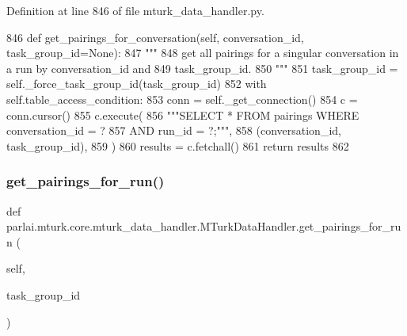 Definition at line 846 of file mturk\+\_\+data\+\_\+handler.\+py.


\begin{DoxyCode}
846     \textcolor{keyword}{def }get\_pairings\_for\_conversation(self, conversation\_id, task\_group\_id=None):
847         \textcolor{stringliteral}{"""}
848 \textcolor{stringliteral}{        get all pairings for a singular conversation in a run by conversation\_id and}
849 \textcolor{stringliteral}{        task\_group\_id.}
850 \textcolor{stringliteral}{        """}
851         task\_group\_id = self.\_force\_task\_group\_id(task\_group\_id)
852         with self.table\_access\_condition:
853             conn = self.\_get\_connection()
854             c = conn.cursor()
855             c.execute(
856                 \textcolor{stringliteral}{"""SELECT * FROM pairings WHERE conversation\_id = ?}
857 \textcolor{stringliteral}{                         AND run\_id = ?;"""},
858                 (conversation\_id, task\_group\_id),
859             )
860             results = c.fetchall()
861             \textcolor{keywordflow}{return} results
862 
\end{DoxyCode}
\mbox{\label{classparlai_1_1mturk_1_1core_1_1mturk__data__handler_1_1MTurkDataHandler_a546d30ff4b76188f71e5309f7a881ab2}} 
\subsubsection{\texorpdfstring{get\+\_\+pairings\+\_\+for\+\_\+run()}{get\_pairings\_for\_run()}}
{\footnotesize\ttfamily def parlai.\+mturk.\+core.\+mturk\+\_\+data\+\_\+handler.\+M\+Turk\+Data\+Handler.\+get\+\_\+pairings\+\_\+for\+\_\+run (\begin{DoxyParamCaption}\item[{}]{self,  }\item[{}]{task\+\_\+group\+\_\+id }\end{DoxyParamCaption})}

